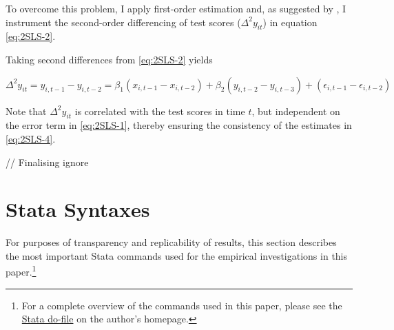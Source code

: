 \documentclass[a4paper, 12pt]{article}
\begin{document}
{To overcome this problem, I apply first-order estimation and, as suggested by \citet{anderson1982formulation}, I instrument the second-order differencing of test scores ($\Delta^2 y_{it}$) in equation \eqref{eq:2SLS-2}.

Taking second differences from \eqref{eq:2SLS-2} yields


\begin{equation} \label{eq:2SLS-5}
\Delta^2 y_{it} = y_{i,t-1} - y_{i,t-2} = \beta_1 (x_{i,t-1} - x_{i,t-2}) + \beta_2 (y_{i,t-2} - y_{i,t-3}) + (\epsilon_{i,t-1} - \epsilon_{i,t-2})
\end{equation}


Note that $\Delta^2 y_{it}$ is correlated with the test scores in time $t$, but independent on the error term in \eqref{eq:2SLS-1}, thereby ensuring the consistency of the estimates in \eqref{eq:2SLS-4}.



// Finalising ignore
}









\section{Stata Syntaxes} \label{Stata}

For purposes of transparency and replicability of results, this section describes the most important Stata commands used for the empirical investigations in this paper.\footnote{For a complete overview of the commands used in this paper, please see the \href{https://drive.google.com/file/d/1xKeplrOmVOscEzwsdp6Xdv5udli-n8UV/view?usp=sharing}{Stata do-file} on the author’s homepage.}
\end{document}
